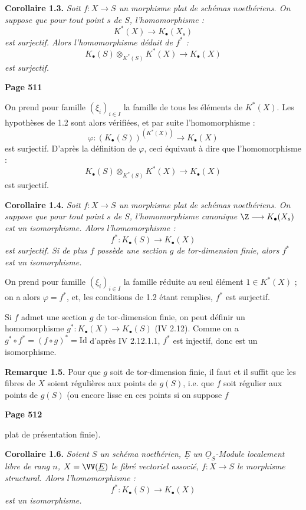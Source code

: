 \smallskip
\noindent\textbf{Corollaire 1.3.} \textit{Soit $f : X \longrightarrow S$ un morphisme plat de sch\'emas noeth\'eriens. On suppose que pour tout point $s$ de $S$, l'homomorphisme :
\[
K^*(X) \longrightarrow K_\bullet(X_s)
\]
est surjectif. Alors l'homomorphisme d\'eduit de $f^*$ :
\[
K_\bullet(S) \otimes_{K^*(S)} K^*(X) \longrightarrow K_\bullet(X)
\]
est surjectif.}

\newpage
\noindent\textbf{Page 511}

On prend pour famille $(\xi_i)_{i \in I}$ la famille de tous les \'el\'ements de $K^*(X)$. Les hypoth\`eses de 1.2 sont alors v\'erifi\'ees, et par suite l'homomorphisme :
\[
\varphi : (K_\bullet(S))^{(K^*(X))} \longrightarrow K_\bullet(X)
\]
est surjectif. D'apr\`es la d\'efinition de $\varphi$, ceci \'equivaut \`a dire que l'homomorphisme :
\[
K_\bullet(S) \otimes_{K^*(S)} K^*(X) \longrightarrow K_\bullet(X)
\]
est surjectif.

\smallskip
\noindent\textbf{Corollaire 1.4.} \textit{Soit $f : X \longrightarrow S$ un morphisme plat de sch\'emas noeth\'eriens. On suppose que pour tout point $s$ de $S$, l'homomorphisme canonique $\Z \longrightarrow K_\bullet(X_s)$ est un isomorphisme. Alors l'homomorphisme :
\[
f^* : K_\bullet(S) \longrightarrow K_\bullet(X)
\]
est surjectif. Si de plus $f$ poss\`ede une section $g$ de tor-dimension finie, alors $f^*$ est un isomorphisme.}

On prend pour famille $(\xi_i)_{i \in I}$ la famille r\'eduite au seul \'el\'ement $1 \in K^*(X)$ ; on a alors $\varphi = f^*$, et, les conditions de 1.2 \'etant remplies, $f^*$ est surjectif.

Si $f$ admet une section $g$ de tor-dimension finie, on peut d\'efinir un homomorphisme $g^* : K_\bullet(X) \longrightarrow K_\bullet(S)$ (IV 2.12). Comme on a $g^* \circ f^* = (f \circ g)^* = \mathrm{Id}$ d'apr\`es IV 2.12.1.1, $f^*$ est injectif, donc est un isomorphisme.

\smallskip
\noindent\textbf{Remarque 1.5.} Pour que $g$ soit de tor-dimension finie, il faut et il suffit que les fibres de $X$ soient r\'eguli\`eres aux points de $g(S)$, i.e. que $f$ soit r\'egulier aux points de $g(S)$ (ou encore lisse en ces points si on suppose $f$

\newpage
\noindent\textbf{Page 512}

plat de pr\'esentation finie).

\medskip
\noindent\textbf{Corollaire 1.6.} \textit{Soient $S$ un sch\'ema noeth\'erien, $\underline{E}$ un $\underline{O}_S$-Module localement libre de rang $n$, $X = \VV(\underline{E})$ le fibr\'e vectoriel associ\'e, $f : X \longrightarrow S$ le morphisme structural. Alors l'homomorphisme :
\[
f^* : K_\bullet(S) \longrightarrow K_\bullet(X)
\]
est un isomorphisme.}

